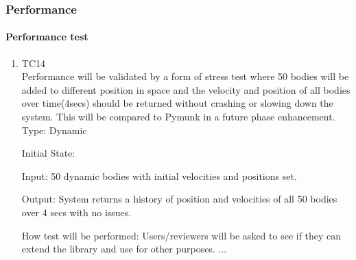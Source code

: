 \documentclass[12pt, titlepage]{article}
\begin{document}

\subsubsection{Performance}

\paragraph{Performance test}

\begin{enumerate}
	
\item{TC14\\}
Performance will be validated by a form of stress test where 50 bodies will be added to different position in space and the velocity and position of all bodies over time(4secs) should be returned without crashing or slowing down the system. This will be compared to Pymunk in a future phase enhancement.
Type: Dynamic

Initial State: 

Input: 50 dynamic bodies with initial velocities and positions set.

Output: System returns a history of position and velocities of all 50 bodies over 4 secs with no issues.

How test will be performed: Users/reviewers will be asked to see if they can extend the library and use for other purposes.
...
\end{enumerate}


%
%
%	
%	
%	
%	
%	
%	
\end{document}
